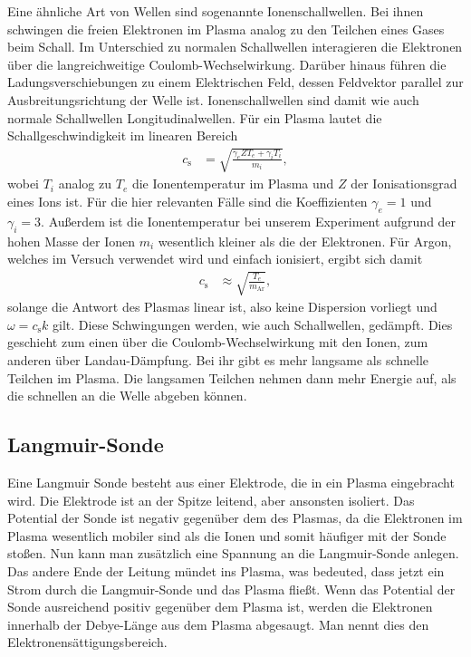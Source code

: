 Eine \"ahnliche Art von Wellen sind sogenannte Ionenschallwellen.
Bei ihnen schwingen die freien Elektronen im Plasma analog zu den Teilchen eines Gases beim Schall.
Im Unterschied zu normalen Schallwellen interagieren die Elektronen \"uber die langreichweitige Coulomb-Wechselwirkung.
Dar\"uber hinaus f\"uhren die Ladungsverschiebungen zu einem Elektrischen Feld, dessen Feldvektor parallel zur Ausbreitungsrichtung der Welle ist.
Ionenschallwellen sind damit wie auch normale Schallwellen Longitudinalwellen.
\cite{schwabedissen99a}
F\"ur ein Plasma lautet die Schallgeschwindigkeit im linearen Bereich
\begin{align}
c_\text{s}
    &=\sqrt{\frac{\gamma_eZT_e+\gamma_iT_i}{m_i}},
    \label{eq:cs1}
\end{align}
wobei $T_i$ analog zu $T_e$ die Ionentemperatur im Plasma und $Z$ der Ionisationsgrad eines Ions ist.
F\"ur die hier relevanten F\"alle sind die Koeffizienten $\gamma_e=1$ und $\gamma_i=3$.
Au\ss erdem ist die Ionentemperatur bei unserem Experiment aufgrund der hohen Masse der Ionen $m_i$ wesentlich kleiner als die der Elektronen.
F\"ur Argon, welches im Versuch verwendet wird und einfach ionisiert, ergibt sich damit
\begin{align}
c_\text{s}
    &\approx\sqrt{\frac{T_e}{m_\text{Ar}}},
    \label{eq:cs2}
\end{align}
solange die Antwort des Plasmas linear ist, also keine Dispersion vorliegt und $\omega=c_\text{s}k$ gilt.
Diese Schwingungen werden, wie auch Schallwellen, ged\"ampft.
Dies geschieht zum einen \"uber die Coulomb-Wechselwirkung mit den Ionen, zum anderen \"uber Landau-D\"ampfung.
\cite{wiki:IAwaves}
Bei ihr gibt es mehr langsame als schnelle Teilchen im Plasma.
Die langsamen Teilchen nehmen dann mehr Energie auf, als die schnellen an die Welle abgeben k\"onnen.
\cite{wiki:Landau}

\subsection{Langmuir-Sonde}
Eine Langmuir Sonde besteht aus einer Elektrode, die in ein Plasma eingebracht wird.
Die Elektrode ist an der Spitze leitend, aber ansonsten isoliert.
Das Potential der Sonde ist negativ gegen\"uber dem des Plasmas, da die Elektronen im Plasma wesentlich mobiler sind als die Ionen und somit h\"aufiger mit der Sonde stoßen.
Nun kann man zus\"atzlich eine Spannung an die Langmuir-Sonde anlegen.
Das andere Ende der Leitung m\"undet ins Plasma, was bedeuted, dass jetzt ein Strom durch die Langmuir-Sonde und das Plasma flie\ss t.
Wenn das Potential der Sonde ausreichend positiv gegen\"uber dem Plasma ist, werden die Elektronen innerhalb der Debye-L\"ange aus dem Plasma abgesaugt.
Man nennt dies den Elektronens\"attigungsbereich.
\cite{anleitung1}

